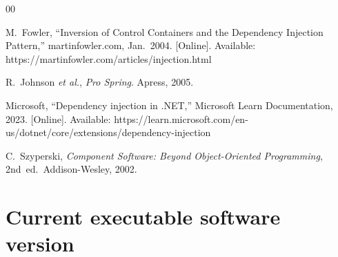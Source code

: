 \documentclass[preprint,12pt, a4paper]{elsarticle}
\begin{document}




\begin{thebibliography}{00}

    M.~Fowler, ``Inversion of Control Containers and the Dependency Injection Pattern,'' martinfowler.com, Jan.\ 2004. [Online]. Available: https://martinfowler.com/articles/injection.html

    R.~Johnson \emph{et al.}, \emph{Pro Spring}. Apress, 2005.

    Microsoft, ``Dependency injection in .NET,'' Microsoft Learn Documentation, 2023. [Online]. Available: https://learn.microsoft.com/en-us/dotnet/core/extensions/dependency-injection

    C.~Szyperski, \emph{Component Software: Beyond Object-Oriented Programming}, 2nd~ed.\ Addison-Wesley, 2002.

\end{thebibliography}


\section*{Current executable software version}
\label{}
\end{document}
